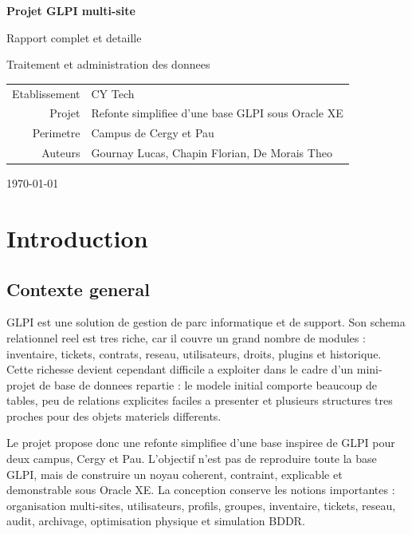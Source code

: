 \documentclass[11pt,a4paper]{article}
\newcommand{\projecttitle}{Projet GLPI multi-site}
\begin{document}
\begin{titlepage}
  \centering
  \vspace*{1.2cm}
  {\Huge\bfseries \projecttitle \par}
  \vspace{0.35cm}
  {\Large Rapport complet et detaille\par}
  \vspace{0.3cm}
  {\large Traitement et administration des donnees\par}
  \vfill
  \begin{tabular}{rl}
    Etablissement & CY Tech \\
    Projet & Refonte simplifiee d'une base GLPI sous Oracle XE \\
    Perimetre & Campus de Cergy et Pau \\
    Auteurs & Gournay Lucas, Chapin Florian, De Morais Theo \\
  \end{tabular}
  \vfill
  {\large \today\par}
\end{titlepage}

\tableofcontents
\newpage

\section{Introduction}

\subsection{Contexte general}

GLPI est une solution de gestion de parc informatique et de support. Son
schema relationnel reel est tres riche, car il couvre un grand nombre de
modules : inventaire, tickets, contrats, reseau, utilisateurs, droits,
plugins et historique. Cette richesse devient cependant difficile a exploiter
dans le cadre d'un mini-projet de base de donnees repartie : le modele initial
comporte beaucoup de tables, peu de relations explicites faciles a presenter et
plusieurs structures tres proches pour des objets materiels differents.

Le projet propose donc une refonte simplifiee d'une base inspiree de GLPI pour
deux campus, Cergy et Pau. L'objectif n'est pas de reproduire toute la base
GLPI, mais de construire un noyau coherent, contraint, explicable et
demonstrable sous Oracle XE. La conception conserve les notions importantes :
organisation multi-sites, utilisateurs, profils, groupes, inventaire, tickets,
reseau, audit, archivage, optimisation physique et simulation BDDR.
\end{document}
